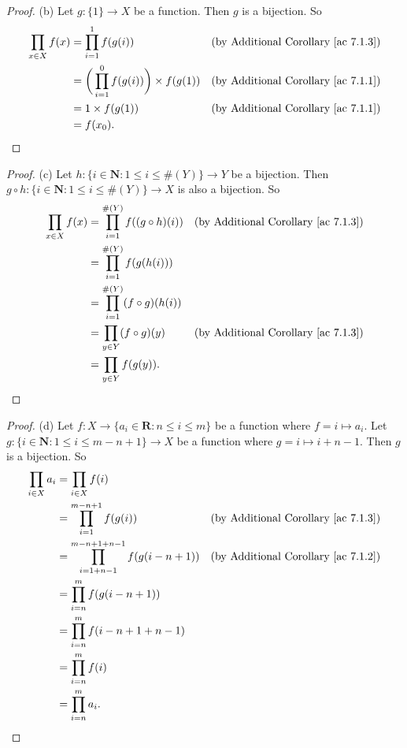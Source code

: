 \begin{proof}{(b)}
Let \(g : \{1\} \to X\) be a function.
Then \(g\) is a bijection.
So
\begin{align*}
\prod_{x \in X} f(x) &= \prod_{i = 1}^1 f(g(i)) & \text{(by Additional Corollary \ref{ac 7.1.3})} \\
&= \bigg(\prod_{i = 1}^0 f(g(i))\bigg) \times f(g(1)) & \text{(by Additional Corollary \ref{ac 7.1.1})} \\
&= 1 \times f(g(1)) & \text{(by Additional Corollary \ref{ac 7.1.1})} \\
&= f(x_0).
\end{align*}
\end{proof}

\begin{proof}{(c)}
Let \(h : \{i \in \mathbf{N} : 1 \leq i \leq \#(Y)\} \to Y\) be a bijection.
Then \(g \circ h : \{i \in \mathbf{N} : 1 \leq i \leq \#(Y)\} \to X\) is also a bijection.
So
\begin{align*}
\prod_{x \in X} f(x) &= \prod_{i = 1}^{\#(Y)} f((g \circ h)(i)) & \text{(by Additional Corollary \ref{ac 7.1.3})} \\
&= \prod_{i = 1}^{\#(Y)} f(g(h(i))) \\
&= \prod_{i = 1}^{\#(Y)} (f \circ g)(h(i)) \\
&= \prod_{y \in Y} (f \circ g)(y) & \text{(by Additional Corollary \ref{ac 7.1.3})} \\
&= \prod_{y \in Y} f(g(y)).
\end{align*}
\end{proof}

\begin{proof}{(d)}
Let \(f : X \to \{a_i \in \mathbf{R} : n \leq i \leq m\}\) be a function where \(f = i \mapsto a_i\).
Let \(g : \{i \in \mathbf{N} : 1 \leq i \leq m - n + 1\} \to X\) be a function where \(g = i \mapsto i + n - 1\).
Then \(g\) is a bijection.
So
\begin{align*}
\prod_{i \in X} a_i &= \prod_{i \in X} f(i) \\
&= \prod_{i = 1}^{m - n + 1} f(g(i)) & \text{(by Additional Corollary \ref{ac 7.1.3})} \\
&= \prod_{i = 1 + n - 1}^{m - n + 1 + n - 1} f(g(i - n + 1)) & \text{(by Additional Corollary \ref{ac 7.1.2})} \\
&= \prod_{i = n}^m f(g(i - n + 1)) \\
&= \prod_{i = n}^m f(i - n + 1 + n - 1) \\
&= \prod_{i = n}^m f(i) \\
&= \prod_{i = n}^m a_i.
\end{align*}
\end{proof}

